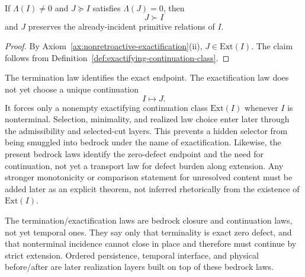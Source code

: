 \begin{corollary}
\label{cor:zero-defect-cannot-arise-in-place}
If \(\Lambda(I)\neq 0\) and \(J\succeq I\) satisfies \(\Lambda(J)=0\), then
\[
J\succ I
\]
and \(J\) preserves the already-incident primitive relations of \(I\).
\end{corollary}

\begin{proof}
By Axiom~\ref{ax:nonretroactive-exactification}(ii), \(J\in\mathrm{Ext}(I)\). The
claim follows from Definition~\ref{def:exactifying-continuation-class}.
\end{proof}

\begin{remark}
\label{rem:exactification-no-hidden-selector}
The termination law identifies the exact endpoint. The exactification law does
not yet choose a unique continuation
\[
I \mapsto J.
\]
It forces only a nonempty exactifying continuation class \(\mathrm{Ext}(I)\) whenever
\(I\) is nonterminal. Selection, minimality, and realized law choice enter
later through the admissibility and selected-cut layers. This prevents a hidden
selector from being smuggled into bedrock under the name of exactification.
Likewise, the present bedrock laws identify the zero-defect endpoint and the
need for continuation, not yet a transport law for defect burden along
extension. Any stronger monotonicity or comparison statement for unresolved
content must be added later as an explicit theorem, not inferred rhetorically
from the existence of \(\mathrm{Ext}(I)\).
\end{remark}

\begin{remark}
\label{rem:exactification-not-yet-time}
The termination/exactification laws are bedrock closure and continuation laws,
not yet temporal ones. They say only that terminality is exact zero defect,
and that nonterminal incidence cannot close in place and therefore must
continue by strict extension. Ordered persistence, temporal interface, and
physical before/after are later realization layers built on top of these
bedrock laws.
\end{remark}

